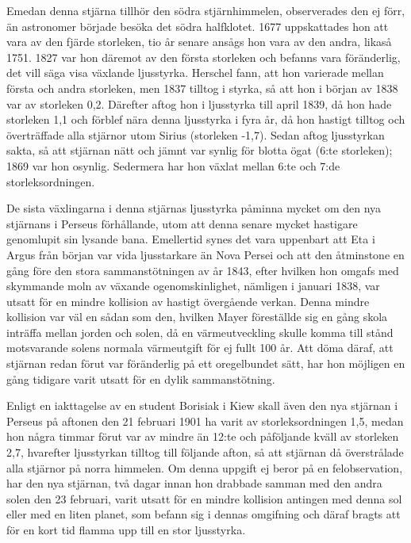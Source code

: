 \documentclass[a4paper, 12pt, oneside, swedish]{article}
\begin{document}
Emedan denna stjärna tillhör den södra stjärnhimmelen, observerades den ej förr, än astronomer började besöka det södra halfklotet. 1677 uppskattades hon att vara av den fjärde storleken, tio år senare ansågs hon vara av den andra, likaså 1751. 1827 var hon däremot av den första storleken och befanns vara föränderlig, det vill säga visa växlande ljusstyrka. Herschel fann, att hon varierade mellan första och andra storleken, men 1837 tilltog i styrka, så att hon i början av 1838 var av storleken 0,2. Därefter aftog hon i ljusstyrka till april 1839, då hon hade storleken 1,1 och förblef nära denna ljusstyrka i fyra år, då hon hastigt tilltog och överträffade alla stjärnor utom Sirius (storleken -1,7). Sedan aftog ljusstyrkan sakta, så att stjärnan nätt och jämnt var synlig för blotta ögat (6:te storleken); 1869 var hon osynlig. Sedermera har hon växlat mellan 6:te och 7:de storleksordningen.

De sista växlingarna i denna stjärnas ljusstyrka påminna mycket om den nya stjärnans i Perseus förhållande, utom att denna senare mycket hastigare genomlupit sin lysande bana. Emellertid synes det vara uppenbart att Eta i Argus från början var vida ljusstarkare än Nova Persei och att den åtminstone en gång före den stora sammanstötningen av år 1843, efter hvilken hon omgafs med skymmande moln av växande ogenomskinlighet, nämligen i januari 1838, var utsatt för en mindre kollision av hastigt övergående verkan. Denna mindre kollision var väl en sådan som den, hvilken Mayer föreställde sig en gång skola inträffa mellan jorden och solen, då en värmeutveckling skulle komma till stånd motsvarande solens normala värmeutgift för ej fullt 100 år. Att döma däraf, att stjärnan redan förut var föränderlig på ett oregelbundet sätt, har hon möjligen en gång tidigare varit utsatt för en dylik sammanstötning.

Enligt en iakttagelse av en student Borisiak i Kiew skall även den nya stjärnan i Perseus på aftonen den 21 februari 1901 ha varit av storleksordningen 1,5, medan hon några timmar förut var av mindre än 12:te och påföljande kväll av storleken 2,7, hvarefter ljusstyrkan tilltog till följande afton, så att stjärnan då överstrålade alla stjärnor på norra himmelen. Om denna uppgift ej beror på en felobservation, har den nya stjärnan, två dagar innan hon drabbade samman med den andra solen den 23 februari, varit utsatt för en mindre kollision antingen med denna sol eller med en liten planet, som befann sig i dennas omgifning och däraf bragts att för en kort tid flamma upp till en stor ljusstyrka.
\end{document}
